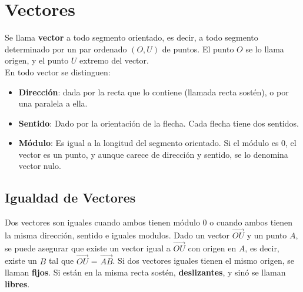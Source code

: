 \documentclass[11pt,a4paper]{article}
\begin{document}
\section{Vectores}
Se llama \textbf{vector} a todo segmento orientado, es decir, a todo segmento determinado por un par ordenado $(O,U)$ de puntos. El punto $O$ se lo llama origen, y el punto $U$ extremo del vector.\\
En todo vector se distinguen:
\begin{itemize}
\item \textbf{Direcci\'on}: dada por la recta que lo contiene (llamada recta sost\'en), o por una paralela a ella.
\item \textbf{Sentido}: Dado por la orientaci\'on de la flecha. Cada flecha tiene dos sentidos.
\item \textbf{M\'odulo}: Es igual a la longitud del segmento orientado. Si el m\'odulo es 0, el vector es un punto, y aunque carece de direcci\'on y sentido, se lo denomina vector nulo.
\end{itemize}
\subsection{Igualdad de Vectores}
Dos vectores son iguales cuando ambos tienen m\'odulo 0 o cuando ambos tienen la misma direcci\'on, sentido e iguales modulos. Dado un vector $\overrightarrow{OU}$ y un punto $A$, se puede asegurar que existe un vector igual a $\overrightarrow{OU}$ con origen en $A$, es decir, existe un $B$ tal que $\overrightarrow{OU}$ = $\overrightarrow{AB}$. Si dos vectores iguales tienen el mismo origen, se llaman \textbf{fijos}. Si est\'an en la misma recta sost\'en, \textbf{deslizantes}, y sin\'o se llaman \textbf{libres}.
\end{document}
